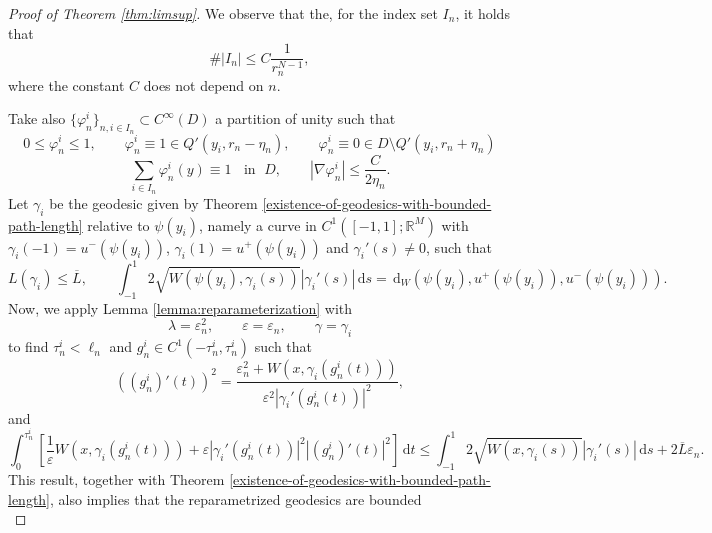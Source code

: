 \documentclass[a4paper, 11pt, reqno]{amsart}
\theoremstyle{plain}
\theoremstyle{definition}
\theoremstyle{remark}
\newcommand{\R}{\mathbb R}
\newcommand{\dd}{\,\mathrm{d}}
\begin{document}
\begin{proof}[Proof of Theorem \ref{thm:limsup}]
We observe that the, for the index set $I_n$, it holds that
\begin{equation}\label{eq:estimate_index_set}
    \#| I_n | \leq C \frac{1}{r_n^{N-1}},
\end{equation}
where the constant $C$ does not depend on $n$.

Take also $\{\varphi_n^i\}_{n, i \in I_n} \subset C^\infty (D)$ a partition of unity such that
\begin{equation}
    0 \leq \varphi_n^i \leq 1, \qquad \varphi_n^i \equiv 1 \in Q'(y_i,r_n-\eta_n), \qquad \varphi_n^i \equiv 0 \in D \setminus Q'(y_i,r_n+\eta_n)
\end{equation}
\begin{equation}
    \sum_{i \in I_n} \varphi_n^i(y) \equiv 1 \;\;\text{ in }\; D, \qquad | \nabla \varphi_n^i | \leq \frac{C}{2\eta_n}.
\end{equation}
Let $\gamma_i$ be the geodesic given by Theorem \ref{existence-of-geodesics-with-bounded-path-length} relative to $\psi(y_i)$, namely a curve in $C^1([-1,1]; \R^M)$ with $\gamma_i (-1) = u^- (\psi(y_i))$, $\gamma_i (1) = u^+ (\psi(y_i))$ and $\gamma_i'(s) \neq 0$, such that
\begin{equation}
    L(\gamma_i) \leq \overline{L}, \qquad \int_{-1}^1 2 \sqrt{W(\psi(y_i), \gamma_i(s))} |\gamma_i'(s)|\dd s = \dd_W(\psi(y_i), u^+(\psi(y_i)), u^-(\psi(y_i))).
\end{equation}
Now, we apply Lemma \ref{lemma:reparameterization} with
$$ \lambda = \varepsilon_n^2, \qquad \varepsilon = \varepsilon_n, \qquad \gamma = \gamma_i $$
to find $\tau_n^i < \ell_n$ and $g_n^i \in C^1(-\tau_n^i, \tau_n^i)$ such that
\begin{equation}\label{eq:reparameterization_limsup}
    ((g_n^i)'(t))^2 = \frac{\varepsilon_n^2 + W(x,\gamma_i(g_n^i(t)))}{\varepsilon^2 | \gamma_i'(g_n^i(t))|^2},
\end{equation}
and
\begin{equation*}
    \int_0^{\tau_n^i} \! \left[ \frac{1}{\varepsilon} W(x, \gamma_i(g_n^i(t))) + \varepsilon |\gamma_i'(g_n^i(t))|^2 | (g_n^i)'(t)|^2 \right] \! \dd t\leq \int_{-1}^1 2 \sqrt{W(x, \gamma_i(s))} | \gamma_i'(s) |  \dd s + 2 \overline{L} \varepsilon_n. %
\end{equation*}
This result, together with Theorem \ref{existence-of-geodesics-with-bounded-path-length}, also implies that the reparametrized geodesics are bounded
\begin{equation}\label{eq:limsup_bounded_geodesics}

\end{equation}
\end{proof}
\end{document}
